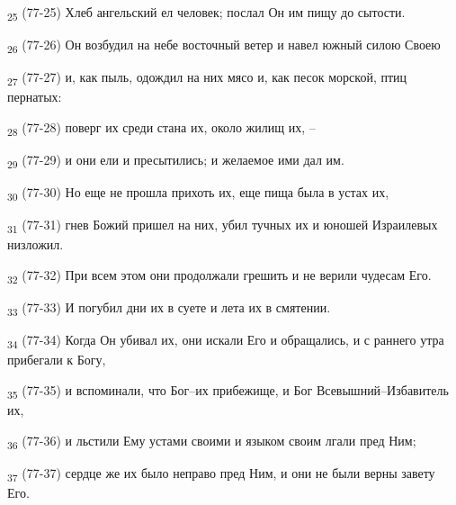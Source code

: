 \begin{tcolorbox}
\textsubscript{25} (77-25) Хлеб ангельский ел человек; послал Он им пищу до сытости.
\end{tcolorbox}
\begin{tcolorbox}
\textsubscript{26} (77-26) Он возбудил на небе восточный ветер и навел южный силою Своею
\end{tcolorbox}
\begin{tcolorbox}
\textsubscript{27} (77-27) и, как пыль, одождил на них мясо и, как песок морской, птиц пернатых:
\end{tcolorbox}
\begin{tcolorbox}
\textsubscript{28} (77-28) поверг их среди стана их, около жилищ их, --
\end{tcolorbox}
\begin{tcolorbox}
\textsubscript{29} (77-29) и они ели и пресытились; и желаемое ими дал им.
\end{tcolorbox}
\begin{tcolorbox}
\textsubscript{30} (77-30) Но еще не прошла прихоть их, еще пища была в устах их,
\end{tcolorbox}
\begin{tcolorbox}
\textsubscript{31} (77-31) гнев Божий пришел на них, убил тучных их и юношей Израилевых низложил.
\end{tcolorbox}
\begin{tcolorbox}
\textsubscript{32} (77-32) При всем этом они продолжали грешить и не верили чудесам Его.
\end{tcolorbox}
\begin{tcolorbox}
\textsubscript{33} (77-33) И погубил дни их в суете и лета их в смятении.
\end{tcolorbox}
\begin{tcolorbox}
\textsubscript{34} (77-34) Когда Он убивал их, они искали Его и обращались, и с раннего утра прибегали к Богу,
\end{tcolorbox}
\begin{tcolorbox}
\textsubscript{35} (77-35) и вспоминали, что Бог--их прибежище, и Бог Всевышний--Избавитель их,
\end{tcolorbox}
\begin{tcolorbox}
\textsubscript{36} (77-36) и льстили Ему устами своими и языком своим лгали пред Ним;
\end{tcolorbox}
\begin{tcolorbox}
\textsubscript{37} (77-37) сердце же их было неправо пред Ним, и они не были верны завету Его.
\end{tcolorbox}

